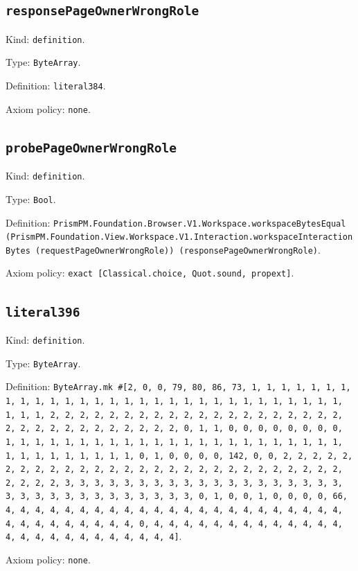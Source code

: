 \documentclass[11pt]{article}
\begin{document}
\subsection*{\texttt{responsePageOwnerWrongRole}}
\noindent Kind: \texttt{definition}.\par
\noindent Type: \texttt{ByteArray}.\par
\noindent Definition: \texttt{literal384}.\par
\noindent Axiom policy: \texttt{none}.\par
\subsection*{\texttt{probePageOwnerWrongRole}}
\noindent Kind: \texttt{definition}.\par
\noindent Type: \texttt{Bool}.\par
\noindent Definition: \texttt{PrismPM.Foundation.Browser.V1.Workspace.workspaceBytesEqual (PrismPM.Foundation.View.Workspace.V1.Interaction.workspaceInteractionBytes (requestPageOwnerWrongRole)) (responsePageOwnerWrongRole)}.\par
\noindent Axiom policy: \texttt{exact [Classical.choice, Quot.sound, propext]}.\par
\subsection*{\texttt{literal396}}
\noindent Kind: \texttt{definition}.\par
\noindent Type: \texttt{ByteArray}.\par
\noindent Definition: \texttt{ByteArray.mk \#[2, 0, 0, 79, 80, 86, 73, 1, 1, 1, 1, 1, 1, 1, 1, 1, 1, 1, 1, 1, 1, 1, 1, 1, 1, 1, 1, 1, 1, 1, 1, 1, 1, 1, 1, 1, 1, 1, 1, 1, 2, 2, 2, 2, 2, 2, 2, 2, 2, 2, 2, 2, 2, 2, 2, 2, 2, 2, 2, 2, 2, 2, 2, 2, 2, 2, 2, 2, 2, 2, 2, 2, 0, 1, 1, 0, 0, 0, 0, 0, 0, 0, 0, 1, 1, 1, 1, 1, 1, 1, 1, 1, 1, 1, 1, 1, 1, 1, 1, 1, 1, 1, 1, 1, 1, 1, 1, 1, 1, 1, 1, 1, 1, 1, 1, 0, 1, 0, 0, 0, 0, 142, 0, 0, 2, 2, 2, 2, 2, 2, 2, 2, 2, 2, 2, 2, 2, 2, 2, 2, 2, 2, 2, 2, 2, 2, 2, 2, 2, 2, 2, 2, 2, 2, 2, 2, 3, 3, 3, 3, 3, 3, 3, 3, 3, 3, 3, 3, 3, 3, 3, 3, 3, 3, 3, 3, 3, 3, 3, 3, 3, 3, 3, 3, 3, 3, 3, 3, 0, 1, 0, 0, 1, 0, 0, 0, 0, 66, 4, 4, 4, 4, 4, 4, 4, 4, 4, 4, 4, 4, 4, 4, 4, 4, 4, 4, 4, 4, 4, 4, 4, 4, 4, 4, 4, 4, 4, 4, 4, 4, 0, 4, 4, 4, 4, 4, 4, 4, 4, 4, 4, 4, 4, 4, 4, 4, 4, 4, 4, 4, 4, 4, 4, 4, 4, 4]}.\par
\noindent Axiom policy: \texttt{none}.\par
\end{document}
